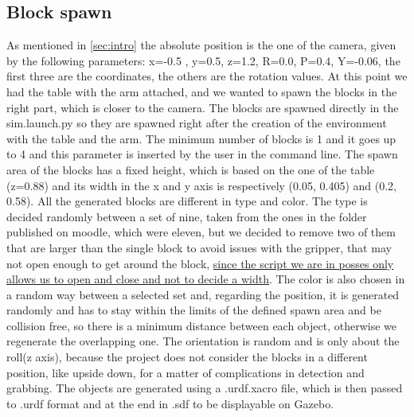 \documentclass[12pt,a4paper]{article}
\begin{document}
\subsection{Block spawn}\label{subsec:blockspawn}
As mentioned in \ref{sec:intro} the absolute position is the one of the camera, given by the following parameters: x=-0.5 , y=0.5, z=1.2, R=0.0, P=0.4, Y=-0.06, the first three are the coordinates, the others are the rotation values. At this point we had the table with the arm attached, and we wanted to spawn the blocks in the right part, which is closer to the camera. The blocks are spawned directly in the sim.launch.py so they are spawned right after the creation of the environment with the table and the arm. The minimum number of blocks is 1 and it goes up to 4 and this parameter is inserted by the user in the command line. The spawn area of the blocks has a fixed height, which is based on the one of the table (z=0.88) and its width in the x and y axis is respectively (0.05, 0.405) and (0.2, 0.58). All the generated blocks are different in type and color. The type is decided randomly between a set of nine, taken from the ones in the folder published on moodle, which were eleven, but we decided to remove two of them that are larger than the single block to avoid issues with the gripper, that may not open enough to get around the block, \uline{since the script we are in posses only allows us to open and close and not to decide a width}. The color is also chosen in a random way between a selected set and, regarding the position, it is generated randomly and has to stay within the limits of the defined spawn area and be collision free, so there is a minimum distance between each object, otherwise we regenerate the overlapping one. The orientation is random and is only about the roll(z axis), because the project does not consider the blocks in a different position, like upside down, for a matter of complications in detection and grabbing.
The objects are generated using a .urdf.xacro file, which is then passed to .urdf format and at the end in .sdf to be displayable on Gazebo. 
\end{document}
